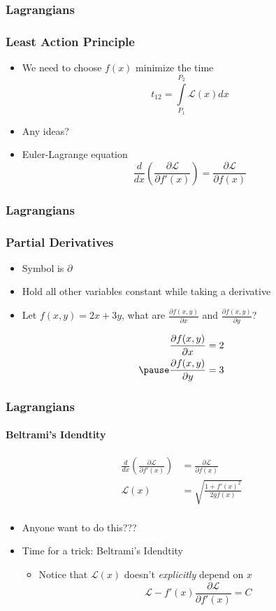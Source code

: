 \documentclass[12pt]{beamer}
\begin{document}
\begin{frame}
\frametitle{Lagrangians}
\frametitle{Least Action Principle}
\begin{itemize}
    \item We need to choose $f(x)$ minimize the time 
    $$
    t_{12} = \int \limits_{P_1}^{P_2} \mathcal{L}(x) dx
    $$
    \pause
    \item Any ideas?
    \pause
    \item Euler-Lagrange equation
    $$
    \frac{d}{dx} \left ( \frac{\partial \mathcal{L} }{\partial f'(x) } \right ) = \frac{\partial \mathcal{L}}{\partial f(x)}
    $$
\end{itemize}
\end{frame}

\begin{frame}
\frametitle{Lagrangians}
\frametitle{Partial Derivatives}
\begin{itemize}
    \item Symbol is $\partial$
    \pause
    \item Hold all other variables constant while taking a derivative
    \pause
    \item Let $f(x,y) = 2x+3y$, what are $\frac{\partial f(x,y)}{\partial x}$ and $\frac{\partial f(x,y)}{\partial y}$?
    \pause
\end{itemize}
\begin{align*}
\frac{\partial f(x,y)}{\partial x} &= 2 \\
\pause
\frac{\partial f(x,y)}{\partial y} &= 3 \\
\end{align*}
\end{frame}

\begin{frame}
\frametitle{Lagrangians}
\framesubtitle{Beltrami's Idendtity}
\begin{align*}
\frac{d}{dx} \left ( \frac{\partial \mathcal{L} }{\partial f'(x) } \right ) &= \frac{\partial \mathcal{L}}{\partial f(x)} \\
\mathcal{L}(x) &= \sqrt{\frac{1 + f'(x)^2}{2gf(x)}} \\
\end{align*}
\begin{itemize}
    \pause
    \item Anyone want to do this???
    \pause
    \item Time for a trick: Beltrami's Idendtity
    \begin{itemize}
        \item Notice that $\mathcal{L}(x)$ doesn't \textit{explicitly} depend on $x$
        $$
        \mathcal{L} - f'(x) \frac{\partial \mathcal{L}}{\partial f'(x)} = C
        $$
    \end{itemize}
\end{itemize}
\end{frame}
\end{document}
